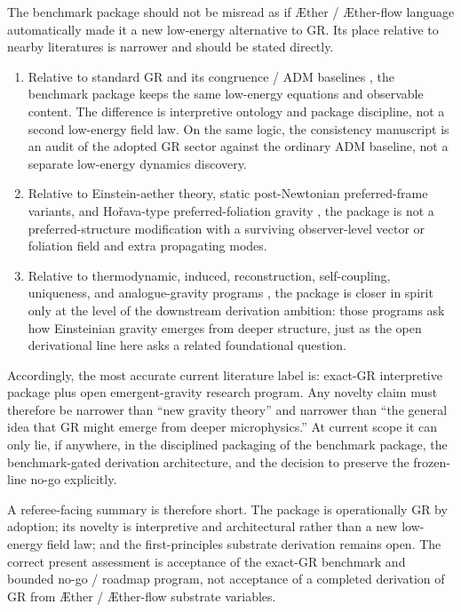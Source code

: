 \documentclass[11pt]{article}
\newcommand{\Aether}{\AE{}ther}
\newcommand{\Aflow}{\AE{}ther-flow}
\begin{document}
The benchmark package should not be misread as if \Aether{} / \Aflow{} language automatically made it a new low-energy alternative to GR. Its place relative to nearby literatures is narrower and should be stated directly.
\begin{enumerate}
    \item Relative to standard GR and its congruence / ADM baselines \cite{Einstein1916,Raychaudhuri1955,EllisVanElst1999,ADM1962}, the benchmark package keeps the same low-energy equations and observable content. The difference is interpretive ontology and package discipline, not a second low-energy field law. On the same logic, the consistency manuscript is an audit of the adopted GR sector against the ordinary ADM baseline, not a separate low-energy dynamics discovery.
    \item Relative to Einstein-aether theory, static post-Newtonian preferred-frame variants, and Ho\v{r}ava-type preferred-foliation gravity \cite{JacobsonMattingly2001,JacobsonMattingly2004,ElingJacobson2004,Jacobson2010,Jacobson2014,JacobsonSperanza2015,Horava2009}, the package is not a preferred-structure modification with a surviving observer-level vector or foliation field and extra propagating modes.
    \item Relative to thermodynamic, induced, reconstruction, self-coupling, uniqueness, and analogue-gravity programs \cite{Jacobson1995,Visser2002,HojmanKucharTeitelboim1976,Deser2004,Lovelock1971,BarceloLiberatiVisser2011,Sakharov1967}, the package is closer in spirit only at the level of the downstream derivation ambition: those programs ask how Einsteinian gravity emerges from deeper structure, just as the open derivational line here asks a related foundational question.
\end{enumerate}

Accordingly, the most accurate current literature label is: exact-GR interpretive package plus open emergent-gravity research program. Any novelty claim must therefore be narrower than ``new gravity theory'' and narrower than ``the general idea that GR might emerge from deeper microphysics.'' At current scope it can only lie, if anywhere, in the disciplined packaging of the benchmark package, the benchmark-gated derivation architecture, and the decision to preserve the frozen-line no-go explicitly.

A referee-facing summary is therefore short. The package is operationally GR by adoption; its novelty is interpretive and architectural rather than a new low-energy field law; and the first-principles substrate derivation remains open. The correct present assessment is acceptance of the exact-GR benchmark and bounded no-go / roadmap program, not acceptance of a completed derivation of GR from \Aether{} / \Aflow{} substrate variables.
\end{document}
